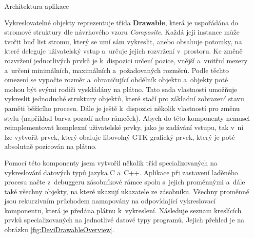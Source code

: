 \documentclass[czech,bachelor,male,python,dept460,hidelinks]{diploma}						%
\newcommand{\parspace}[1][]{
	\ifthenelse{\isempty{#1}}{\vspace{0mm}}{\vspace{#1}}
	\par
}
\begin{document}
\begin{section}{Architektura aplikace}
	\parspace Vykreslovatelné objekty reprezentuje třída \textbf{Drawable}, která je uspořádána do stromové struktury dle návrhového vzoru
	\textit{Composite}. \cite[183]{gof} Každá její instance může tvořit buď list stromu, který se umí sám vykreslit, anebo obsahuje potomky, na které deleguje
	uživatelský vstup a~určuje jejich rozvržení v~prostoru. Ke změně rozvržení jednotlivých prvků je k~dispozici určení pozice, vnější a~vnitřní mezery
	a~určení minimálních, maximálních a~požadovaných rozměrů. Podle těchto omezení se vypočte rozměr a~ohraničující obdélník objektu a~objekty poté mohou být
	svými rodiči vyskládány na plátno.
	Tato sada vlastností umožňuje vykreslit jednoduché struktury objektů, které stačí pro základní zobrazení stavu paměti běžícího procesu.
	Dále je ještě k~dispozici několik vlastností pro změnu stylu (například barva pozadí nebo rámeček). Abych do této komponenty
	nemusel reimplementovat komplexní uživatelské prvky, jako je zadávání vstupu, tak v~ní lze vytvořit prvek, který obaluje libovolný GTK grafický prvek,
	který je poté absolutně pozicován na plátno.
	
	\parspace Pomocí této komponenty jsem vytvořil několik tříd specializovaných na vykreslování datových typů jazyka C a~C++. Aplikace při zastavení laděného
	procesu načte z~debuggeru zásobníkové rámce spolu s~jejich proměnnými a~dále také všechny objekty, na které ukazují ukazatele ze zásobníku.
	Všechny proměnné jsou rekurzivním průchodem namapovány na odpovídající vykreslovací komponentu, která je předána plátnu k~vykreslení.
	Následuje seznam kreslících prvků specializovaných na jednotlivé datové typy programů. Jejich přehled je na obrázku \ref{fig:DeviDrawableOverview}.
	
	

\end{section}
\end{document}
